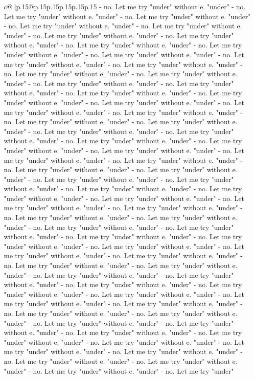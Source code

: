 \documentclass{article}
\begin{document}
{\begin{supertabular}{c@{$\;$}|p{.15\linewidth}@{}p{.15\linewidth}p{.15\linewidth}p{.15\linewidth}p{.15\linewidth}p{.15\linewidth}}
{{{{-} no. Let me try "under" without e. "under" {-} no. Let me try "under" without e. "under" {-} no. Let me try "under" without e. "under" {-} no. Let me try "under" without e. "under" {-} no. Let me try "under" without e. "under" {-} no. Let me try "under" without e. "under" {-} no. Let me try "under" without e. "under" {-} no. Let me try "under" without e. "under" {-} no. Let me try "under" without e. "under" {-} no. Let me try "under" without e. "under" {-} no. Let me try "under" without e. "under" {-} no. Let me try "under" without e. "under" {-} no. Let me try "under" without e. "under" {-} no. Let me try "under" without e. "under" {-} no. Let me try "under" without e. "under" {-} no. Let me try "under" without e. "under" {-} no. Let me try "under" without e. "under" {-} no. Let me try "under" without e. "under" {-} no. Let me try "under" without e. "under" {-} no. Let me try "under" without e. "under" {-} no. Let me try "under" without e. "under" {-} no. Let me try "under" without e. "under" {-} no. Let me try "under" without e. "under" {-} no. Let me try "under" without e. "under" {-} no. Let me try "under" without e. "under" {-} no. Let me try "under" without e. "under" {-} no. Let me try "under" without e. "under" {-} no. Let me try "under" without e. "under" {-} no. Let me try "under" without e. "under" {-} no. Let me try "under" without e. "under" {-} no. Let me try "under" without e. "under" {-} no. Let me try "under" without e. "under" {-} no. Let me try "under" without e. "under" {-} no. Let me try "under" without e. "under" {-} no. Let me try "under" without e. "under" {-} no. Let me try "under" without e. "under" {-} no. Let me try "under" without e. "under" {-} no. Let me try "under" without e. "under" {-} no. Let me try "under" without e. "under" {-} no. Let me try "under" without e. "under" {-} no. Let me try "under" without e. "under" {-} no. Let me try "under" without e. "under" {-} no. Let me try "under" without e. "under" {-} no. Let me try "under" without e. "under" {-} no. Let me try "under" without e. "under" {-} no. Let me try "under" without e. "under" {-} no. Let me try "under" without e. "under" {-} no. Let me try "under" without e. "under" {-} no. Let me try "under" without e. "under" {-} no. Let me try "under" without e. "under" {-} no. Let me try "under" without e. "under" {-} no. Let me try "under" without e. "under" {-} no. Let me try "under" without e. "under" {-} no. Let me try "under" without e. "under" {-} no. Let me try "under" without e. "under" {-} no. Let me try "under" without e. "under" {-} no. Let me try "under" without e. "under" {-} no. Let me try "under" without e. "under" {-} no. Let me try "under" without e. "under" {-} no. Let me try "under" without e. "under" {-} no. Let me try "under" without e. "under" {-} no. Let me try "under" without e. "under" {-} no. Let me try "under" without e. "under" {-} no. Let me try "under" without e. "under" {-} no. Let me try "under" without e. "under" {-} no. Let me try "under" without e. "under" {-} no. Let me try "under" without e. "under" {-} no. Let me try "under" without e. "under" {-} no. Let me try "under" without e. "under" {-} no. Let me try "under" }}}
\end{supertabular}}
\end{document}
